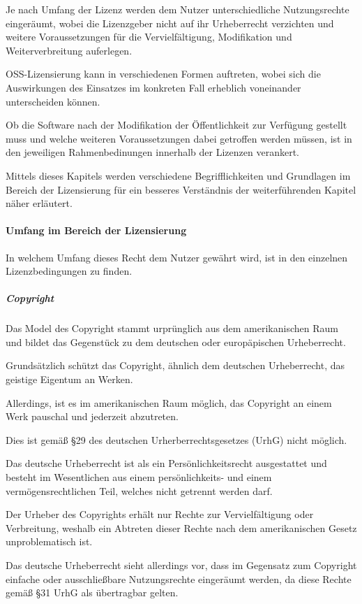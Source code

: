 Je nach Umfang der Lizenz werden dem Nutzer unterschiedliche Nutzungsrechte eingeräumt, wobei die Lizenzgeber nicht auf ihr Urheberrecht verzichten und weitere Voraussetzungen für die Vervielfältigung, Modifikation und Weiterverbreitung auferlegen. 

OSS-Lizensierung kann in verschiedenen Formen auftreten, wobei sich die Auswirkungen des Einsatzes im konkreten Fall erheblich voneinander unterscheiden können.   

Ob die Software nach der Modifikation der Öffentlichkeit zur Verfügung gestellt muss und welche weiteren Voraussetzungen dabei getroffen werden müssen, ist in den jeweiligen Rahmenbedinungen innerhalb der Lizenzen verankert. 

Mittels dieses Kapitels werden verschiedene Begrifflichkeiten und Grundlagen im Bereich der Lizensierung für ein besseres Verständnis der weiterführenden Kapitel näher erläutert. 

\paragraph{Umfang im Bereich der Lizensierung}
In welchem Umfang dieses Recht dem Nutzer gewährt wird, ist in den einzelnen Lizenzbedingungen zu finden. 

\subparagraph{Copyright}
Das Model des Copyright stammt urprünglich aus dem amerikanischen Raum und bildet das Gegenstück zu dem deutschen oder europäpischen Urheberrecht. 

Grundsätzlich schützt das Copyright, ähnlich dem deutschen Urheberrecht, das geistige Eigentum an Werken. 

Allerdings, ist es im amerikanischen Raum möglich, das Copyright an einem Werk pauschal und jederzeit abzutreten. 

Dies ist gemäß §29 des deutschen Urherberrechtsgesetzes (UrhG) nicht möglich. 

Das deutsche Urheberrecht ist als ein Persönlichkeitsrecht ausgestattet und besteht im Wesentlichen aus einem persönlichkeits- und einem vermögensrechtlichen Teil, welches nicht getrennt werden darf. 

Der Urheber des Copyrights erhält nur Rechte zur Vervielfältigung oder Verbreitung, weshalb ein Abtreten dieser Rechte nach dem amerikanischen Gesetz unproblematisch ist. 

Das deutsche Urheberrecht sieht allerdings vor, dass im Gegensatz zum Copyright einfache oder ausschließbare Nutzungsrechte eingeräumt werden, da diese Rechte gemäß §31 UrhG als übertragbar gelten. 


